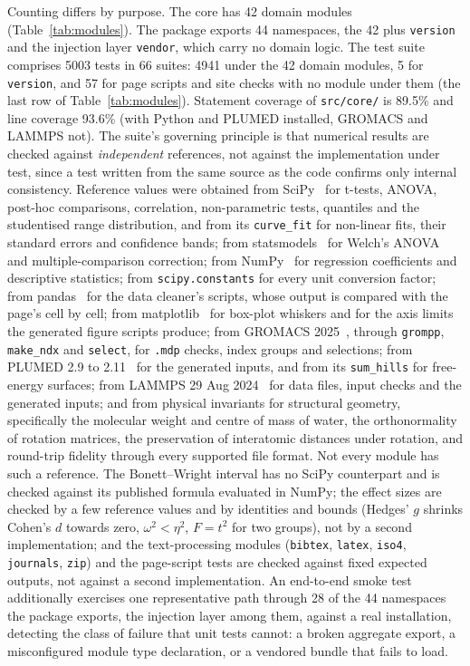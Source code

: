 \documentclass[11pt,a4paper]{article}
\begin{document}
Counting differs by purpose. The core has 42 domain modules
(Table~\ref{tab:modules}). The package exports 44 namespaces, the 42 plus
\texttt{version} and the injection layer \texttt{vendor}, which carry no domain
logic. The test suite comprises 5003 tests in 66 suites: 4941 under the 42 domain
modules, 5 for \texttt{version}, and 57 for page scripts and site checks with no
module under them (the last row of Table~\ref{tab:modules}). Statement coverage
of \texttt{src/core/} is 89.5\% and line coverage 93.6\% (with Python and PLUMED
installed, GROMACS and LAMMPS not). The suite's governing
principle is that numerical results are checked against \emph{independent}
references, not against the implementation under test, since a test written from
the same source as the code confirms only internal consistency.
Reference values were obtained from SciPy~\cite{virtanen2020} for t-tests,
ANOVA, post-hoc comparisons, correlation, non-parametric tests, quantiles and
the studentised range distribution, and from its \texttt{curve\_fit} for
non-linear fits, their standard errors and confidence bands; from
statsmodels~\cite{seabold2010} for
Welch's ANOVA and multiple-comparison correction; from NumPy~\cite{harris2020} for regression coefficients and
descriptive statistics; from \texttt{scipy.constants} for every unit conversion
factor; from pandas~\cite{mckinney2010} for the data cleaner's scripts, whose
output is compared with the page's cell by cell; from
matplotlib~\cite{hunter2007} for box-plot whiskers and for the axis limits the
generated figure scripts produce; from GROMACS 2025~\cite{abraham2015}, through
\texttt{grompp}, \texttt{make\_ndx} and \texttt{select}, for \texttt{.mdp}
checks, index groups and selections; from PLUMED 2.9 to
2.11~\cite{tribello2014} for the generated inputs, and from its
\texttt{sum\_hills} for free-energy surfaces; from LAMMPS 29 Aug
2024~\cite{thompson2022} for data files, input checks and the generated inputs;
and from physical invariants for structural geometry, specifically
the molecular weight and centre of mass of water, the orthonormality of
rotation matrices, the preservation of interatomic distances under rotation, and
round-trip fidelity through every supported file format. Not every module has
such a reference. The Bonett--Wright interval has no SciPy counterpart and is
checked against its published formula evaluated in NumPy; the effect sizes are
checked by a few reference values and by identities and bounds (Hedges' $g$
shrinks Cohen's $d$ towards zero, $\omega^2 < \eta^2$, $F = t^2$ for two groups),
not by a second implementation; and the text-processing modules
(\texttt{bibtex}, \texttt{latex}, \texttt{iso4}, \texttt{journals},
\texttt{zip}) and the page-script tests are checked against fixed expected
outputs, not against a second implementation.
An end-to-end smoke
test additionally exercises one representative path through 28 of the 44
namespaces the package exports, the injection layer among them, against a real
installation, detecting the class of failure that
unit tests cannot: a broken aggregate export, a misconfigured module type
declaration, or a vendored bundle that fails to load.
\end{document}
